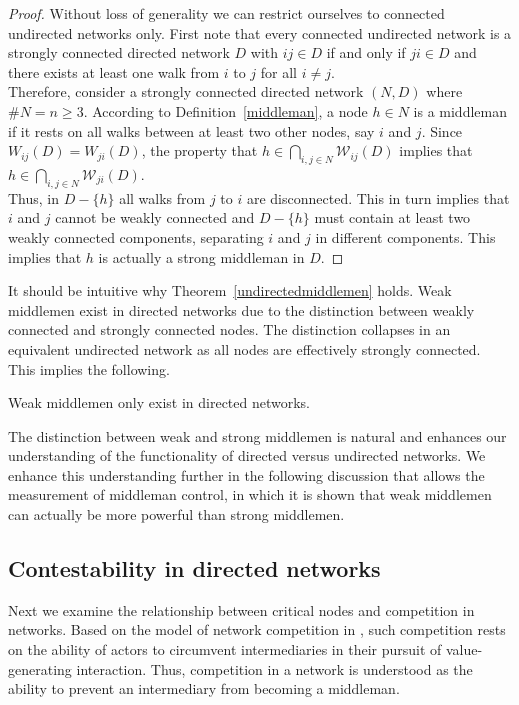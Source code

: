 \begin{proof}
Without loss of generality we can restrict ourselves to connected undirected networks only. First note that every connected undirected network is a strongly connected directed network $D$ with $ij \in D$ if and only if $ji \in D$ and there exists at least one walk from $i$ to $j$ for all $i \neq j$.
\\
Therefore, consider a strongly connected directed network $(N,D)$ where $\# N =n \geqslant 3$. According to Definition~\ref{middleman}, a node $h \in N$ is a middleman if it rests on all walks between at least two other nodes, say $i$ and $j$. Since $W_{ij}(D) = W_{ji}(D)$, the property that $h \in \bigcap_{i,j \in N} \mathcal{W}_{ij}(D)$ implies that $h \in \bigcap_{i,j \in N} \mathcal{W}_{ji}(D)$.
\\
Thus, in $D - \{h\}$ all walks from $j$ to $i$ are disconnected. This in turn implies that $i$ and $j$ cannot be weakly connected and $D - \{h\}$ must contain at least two weakly connected components, separating $i$ and $j$ in different components. This implies that $h$ is actually a strong middleman in $D$.
\end{proof}

\medskip \noindent It should be intuitive why Theorem~\ref{undirectedmiddlemen} holds. Weak middlemen exist in directed networks due to the distinction between weakly connected and strongly connected nodes. The distinction collapses in an equivalent undirected network as all nodes are effectively strongly connected. This implies the following.

\begin{corollary} \label{corundirectedmiddleman}
Weak middlemen only exist in directed networks.
\end{corollary}

The distinction between weak and strong middlemen is natural and enhances our understanding of the functionality of directed versus undirected networks. We enhance this understanding further in the following discussion that allows the measurement of middleman control, in which it is shown that weak middlemen can actually be more powerful than strong middlemen.

\subsection{Contestability in directed networks}

Next we examine the relationship between critical nodes and competition in networks. Based on the model of network competition in \citet{GillesDiamantaris2013}, such competition rests on the ability of actors to circumvent intermediaries in their pursuit of value-generating interaction. Thus, competition in a network is understood as the ability to prevent an intermediary from becoming a middleman.

